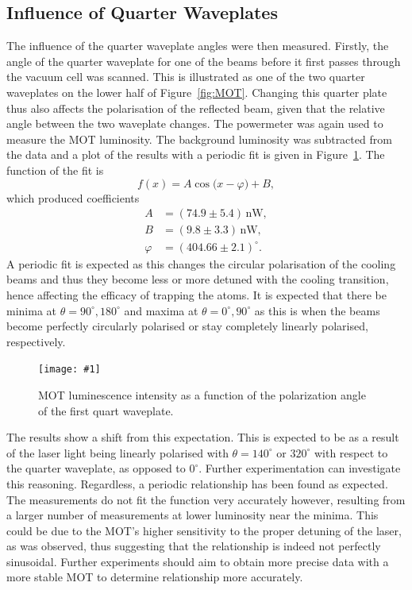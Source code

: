 \documentclass[twocolumn]{article}
\newcommand{\insertFigure}[1]{%
   \texttt{[image: \#1]}%
}
\begin{document}
\subsection{Influence of Quarter Waveplates}
The influence of the quarter waveplate angles were then measured. Firstly, the angle of the quarter waveplate for one of the beams before it first passes through the vacuum cell was scanned. This is illustrated as one of the two quarter waveplates on the lower half of Figure~\ref{fig:MOT}. Changing this quarter plate thus also affects the polarisation of the reflected beam, given that the relative angle between the two waveplate changes. The powermeter was again used to measure the MOT luminosity. The background luminosity was subtracted from the data and a plot of the results with a periodic fit is given in Figure~\ref{fig:Waveplate}. The function of the fit is
\begin{equation}
f(x) = A \cos\big(x - \varphi \big) + B, \nonumber
\end{equation}
which produced coefficients
\begin{align*}
A &=  (74.9 \pm 5.4) \, \text{nW},\\
B &=  (9.8 \pm 3.3) \, \text{nW},\\
\varphi &=  (404.66 \pm 2.1)^\circ.
\end{align*}
A periodic fit is expected as this changes the circular polarisation of the cooling beams and thus they become less or more detuned with the cooling transition, hence affecting the efficacy of trapping the atoms. It is expected that there be minima at $\theta=90^\circ, 180^\circ$ and maxima at $\theta=0^\circ, 90^\circ$ as this is when the beams become perfectly circularly polarised or stay completely linearly polarised, respectively. 
\begin{figure} [!h]
	\centering
	\insertFigure{Images/Waveplate1_w_fit.png}
	\caption{MOT luminescence intensity as a function of the polarization angle of the first quart waveplate.}
	\label{fig:Waveplate}
\end{figure}
The results show a shift from this expectation. This is expected to be as a result of the laser light being linearly polarised with $\theta=140^\circ$ or $320^\circ$ with respect to the quarter waveplate, as opposed to $0^\circ$. Further experimentation can investigate this reasoning. Regardless, a periodic relationship has been found as expected. The measurements do not fit the function very accurately however, resulting from a larger number of measurements at lower luminosity near the minima. This could be due to the MOT's higher sensitivity to the proper detuning of the laser, as was observed, thus suggesting that the relationship is indeed not perfectly sinusoidal. Further experiments should aim to obtain more precise data with a more stable MOT to determine relationship more accurately. \\
\end{document}
